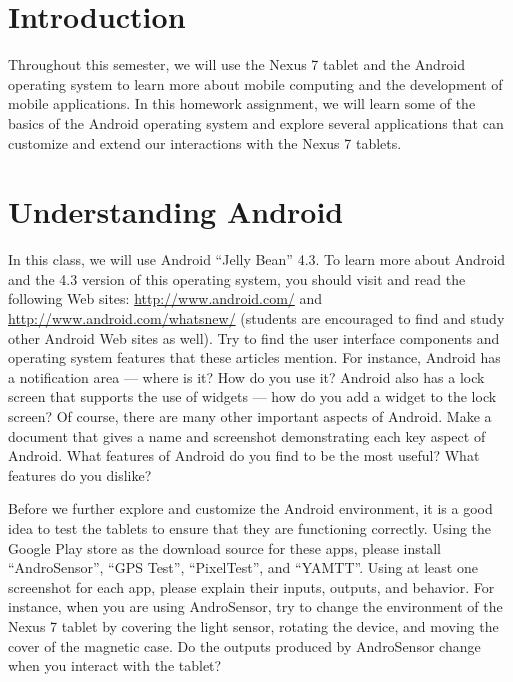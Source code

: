 

\usepackage[compact]{titlesec}



\section*{Introduction}

Throughout this semester, we will use the Nexus 7 tablet and the Android operating system to learn more about mobile
computing and the development of mobile applications.  In this homework assignment, we will learn some of the basics of
the Android operating system and explore several applications that can customize and extend our interactions with the
Nexus 7 tablets.

\section*{Understanding Android}

In this class, we will use Android ``Jelly Bean'' 4.3.  To learn more about Android and the 4.3 version of this
operating system, you should visit and read the following Web sites: \url{http://www.android.com/} and
\url{http://www.android.com/whatsnew/} (students are encouraged to find and study other Android Web sites as well). Try
to find the user interface components and operating system features that these articles mention.  For instance, Android
has a notification area --- where is it?  How do you use it? Android also has a lock screen that supports the use of
widgets --- how do you add a widget to the lock screen?  Of course, there are many other important aspects of Android.
Make a document that gives a name and screenshot demonstrating each key aspect of Android.  What features of Android do you
find to be the most useful?  What features do you dislike?

Before we further explore and customize the Android environment, it is a good idea to test the tablets to ensure that
they are functioning correctly.  Using the Google Play store as the download source for these apps, please install
``AndroSensor'', ``GPS Test'', ``PixelTest'', and ``YAMTT''.  Using at least one screenshot for each app, please explain
their inputs, outputs, and behavior.  For instance, when you are using AndroSensor, try to change the environment of
the Nexus 7 tablet by covering the light sensor, rotating the device, and moving the cover of the magnetic case.  Do the
outputs produced by AndroSensor change when you interact with the tablet?

